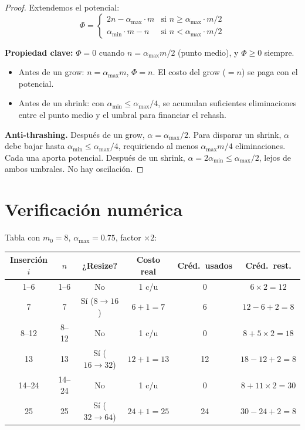 \documentclass[11pt, letterpaper]{article}
\theoremstyle{definition}
\theoremstyle{plain}
\theoremstyle{remark}
\begin{document}
\begin{proof}
Extendemos el potencial:
\[
  \Phi = \begin{cases}
    2n - \alpha_{\max} \cdot m
      & \text{si } n \geq \alpha_{\max} \cdot m / 2 \\
    \alpha_{\min} \cdot m - n
      & \text{si } n < \alpha_{\max} \cdot m / 2
  \end{cases}
\]

\textbf{Propiedad clave:} $\Phi = 0$ cuando
$n = \alpha_{\max} m / 2$ (punto medio), y $\Phi \geq 0$ siempre.
\begin{itemize}
  \item Antes de un grow: $n = \alpha_{\max} m$, $\Phi = n$. El
    costo del grow ($= n$) se paga con el potencial.
  \item Antes de un shrink: con
    $\alpha_{\min} \leq \alpha_{\max}/4$, se acumulan suficientes
    eliminaciones entre el punto medio y el umbral para financiar el
    rehash.
\end{itemize}

\textbf{Anti-thrashing.} Después de un grow,
$\alpha = \alpha_{\max}/2$. Para disparar un shrink, $\alpha$ debe
bajar hasta $\alpha_{\min} \leq \alpha_{\max}/4$, requiriendo al
menos $\alpha_{\max} m / 4$ eliminaciones. Cada una aporta potencial.
Después de un shrink, $\alpha = 2\alpha_{\min} \leq \alpha_{\max}/2$,
lejos de ambos umbrales. No hay oscilación.
\end{proof}

\section{Verificación numérica}

Tabla con $m_0 = 8$, $\alpha_{\max} = 0.75$, factor $\times 2$:

\begin{table}[h]
\centering
\begin{tabular}{cccccc}
\toprule
Inserción $i$ & $n$ & ¿Resize? & Costo real & Créd.\ usados
  & Créd.\ rest. \\
\midrule
1--6   & 1--6  & No  & 1 c/u   & 0  & $6 \times 2 = 12$ \\
7      & 7     & Sí ($8 \to 16$)  & $6{+}1=7$   & 6  & $12{-}6{+}2=8$ \\
8--12  & 8--12 & No  & 1 c/u   & 0  & $8{+}5{\times}2=18$ \\
13     & 13    & Sí ($16 \to 32$) & $12{+}1=13$ & 12 & $18{-}12{+}2=8$ \\
14--24 & 14--24 & No & 1 c/u   & 0  & $8{+}11{\times}2=30$ \\
25     & 25    & Sí ($32 \to 64$) & $24{+}1=25$ & 24 & $30{-}24{+}2=8$ \\
\bottomrule
\end{tabular}
\end{table}
\end{document}
